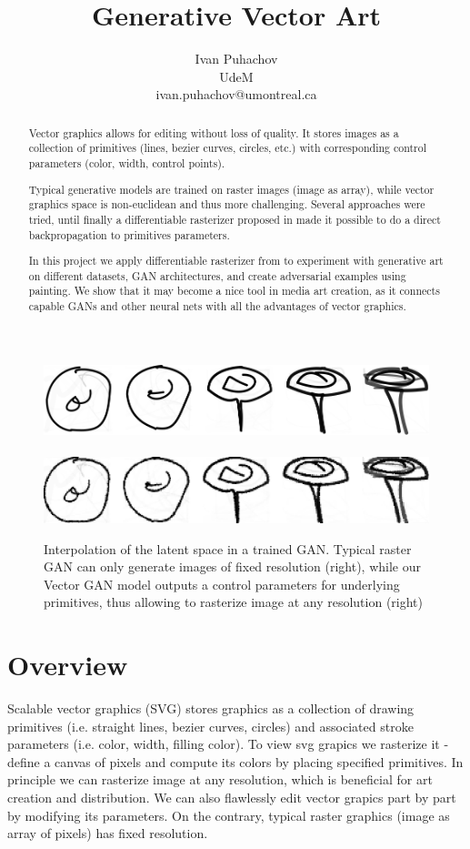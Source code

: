\documentclass{article}
\title{Generative Vector Art}
\author{
	Ivan Puhachov \\ 
	UdeM \\
	ivan.puhachov@umontreal.ca \\
}
\begin{document}
	
	\maketitle
	
	\begin{abstract}
		Vector graphics allows for editing without loss of quality. It stores images as a collection of primitives (lines, bezier curves, circles, etc.) with corresponding control parameters (color, width, control points).
		
		Typical generative models are trained on raster images (image as array), while vector graphics space is non-euclidean and thus more challenging. Several approaches were tried, until finally a differentiable rasterizer proposed in \cite{diffsvg} made it possible to do a direct backpropagation to primitives parameters. 

		In this project we apply differentiable rasterizer from \cite{diffsvg} to experiment with generative art on different datasets, GAN architectures, and create adversarial examples using painting. We show that it may become a nice tool in media art creation, as it connects capable GANs and other neural nets with all the advantages of vector graphics.
	\end{abstract}

	\begin{figure}[h]
		\includegraphics[width=0.45\linewidth]{img/my_plot_vector.png}
		\hspace{4mm}
		\unskip\ \vrule\
		\hspace{4mm}
		\includegraphics[width=0.45\linewidth]{img/my_plot_raster.png}
		\caption{Interpolation of the latent space in a trained GAN. Typical raster GAN can only generate images of fixed resolution (right), while our Vector GAN model outputs a control parameters for underlying primitives, thus allowing to rasterize image at any resolution (right)}
		\label{fig:inter}
	\end{figure}
	
	\section{Overview}
	Scalable vector graphics (SVG) stores graphics as a collection of drawing primitives (i.e. straight lines, bezier curves, circles) and associated stroke parameters (i.e. color, width, filling color). To view svg grapics we rasterize it - define a canvas of pixels and compute its colors by placing specified primitives. In principle we can rasterize image at any resolution, which is beneficial for art creation and distribution. We can also flawlessly edit vector grapics part by part by modifying its parameters. On the contrary, typical raster graphics (image as array of pixels) has fixed resolution. 
	
\end{document}
